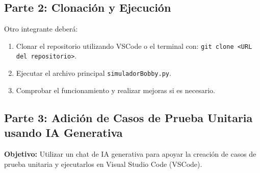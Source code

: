 \subsection*{Parte 2: Clonación y Ejecución}
Otro integrante deberá:
\begin{enumerate}
    \item Clonar el repositorio utilizando VSCode o el terminal con: \texttt{git clone <URL del repositorio>}.
    \item Ejecutar el archivo principal \texttt{simuladorBobby.py}.
    \item Comprobar el funcionamiento y realizar mejoras si es necesario.
\end{enumerate}

\subsection*{Parte 3: Adición de Casos de Prueba Unitaria usando IA Generativa}
\textbf{Objetivo:} Utilizar un chat de IA generativa para apoyar la creación de casos de prueba unitaria y ejecutarlos en Visual Studio Code (VSCode).

